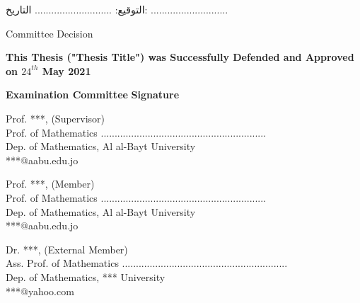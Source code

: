\documentclass[12pt,a4paper,oneside]{book} %
\theoremstyle{definition}
\newcommand{\size}[2]{{\fontsize{#1}{0}\selectfont#2}} %
\begin{document}
\vspace{0.5in}

\begin{Arabic}
\size{14}{التوقيع}: ............................ \hspace{1.4in} \size{14}{التاريخ}: ............................
\end{Arabic}




\clearpage
{}  
{}	%
\centerline{\size{16}{Committee Decision}}
\vspace{0.25in}
\noindent \textbf{This Thesis ("Thesis Title") was Successfully Defended and Approved on $24^{th}$ May 2021}

\vspace{0.25in}

\hspace{0.15in} \textbf{Examination Committee} \hspace{2in} \textbf{Signature}

\vspace{0.5in}

\noindent Prof. ***, (Supervisor)
\\Prof. of Mathematics \hfill ............................................................
\\Dep. of Mathematics, Al al-Bayt University
\\***@aabu.edu.jo

\vspace{0.5in}

\noindent Prof. ***, (Member)
\\Prof. of Mathematics \hfill ............................................................
\\Dep. of Mathematics, Al al-Bayt University
\\***@aabu.edu.jo

\vspace{0.5in}

\noindent Dr. ***, (External Member)
\\Ass. Prof. of Mathematics \hfill ............................................................
\\Dep. of Mathematics, *** University
\\***@yahoo.com

\vspace{0.5in}
\end{document}

